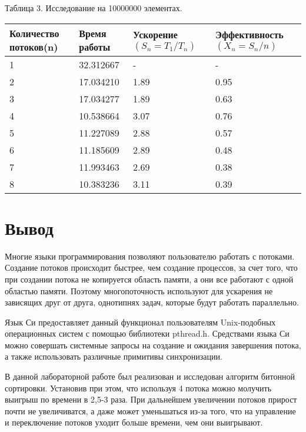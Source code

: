 \documentclass[pdf, unicode, 12pt, a4paper,oneside,fleqn]{article}
\begin{document}
Таблица 3. Исследование на 10000000 элементах.

\begin{tabular}{|p{35mm}|p{35mm}|p{35mm}|p{35mm}|}
    \hline
    {Количество \newline потоков(n)} &Время работы&{Ускорение \newline $(S_n=T_1/T_n)$}&Эффективность $(X_n=S_n/n)$\\
    \hline
    1&32.312667&-&-\\
    \hline
    2&17.034210&1.89&0.95\\
    \hline
    3&17.034277&1.89&0.63\\
    \hline
    4&10.538664&3.07&0.76\\
    \hline
    5&11.227089&2.88&0.57\\
    \hline
    6&11.185609&2.89&0.48\\
    \hline
    7&11.993463&2.69&0.38\\
    \hline
    8&10.383236&3.11&0.39\\
    \hline
\end{tabular}

\pagebreak

\section{Вывод}

Многие языки программирования позволяют пользователю работать с потоками. 
Создание потоков происходит быстрее, чем создание процессов, за счет того, что
при создании потока не копируется область памяти, а они все работают с одной
областью памяти. Поэтому многопоточность используют для ускарения не зависящих
друг от друга, однотипнях задач, которые будут работать параллельно.

Язык Си предоставляет данный функционал пользователям Unix-подобных операционных
систем с помощью библиотеки pthread.h. Средствами языка Си можно совершать системные
запросы на создание и ожидания завершения потока, а также использовать различные
примитивы синхронизации.

В данной лабораторной работе был реализован и исследован алгоритм битонной сортировки.
Установив при этом, что используя 4 потока можно молучить выигрыш по времени
в 2,5-3 раза. При дальнейшем увеличении потоков прирост почти не увеличиватся, а
даже может уменьшаться из-за того, что на управление и переключение потоков 
уходит больше времени, чем они выигрывают.
\end{document}
